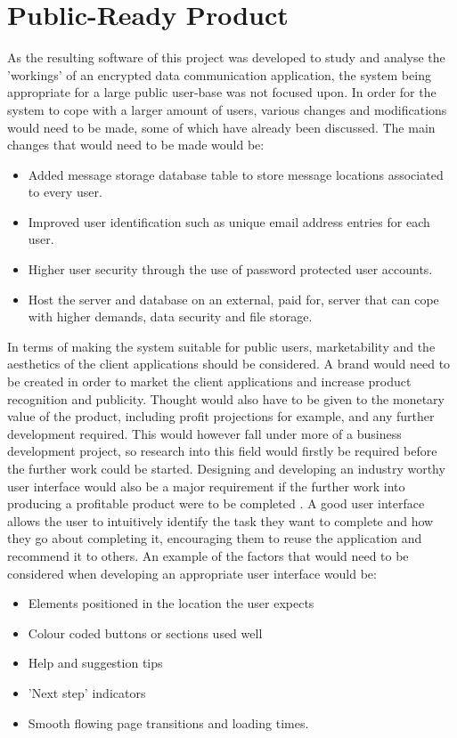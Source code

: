 \documentclass[a4paper,10pt]{report}
\begin{document}
\section{Public-Ready Product}

As the resulting software of this project was developed to study and analyse the 'workings' of an encrypted data communication application, the system being appropriate for a large public user-base was not focused upon. In order for the system to cope with a larger amount of users, various changes and modifications would need to be made, some of which have already been discussed. The main changes that would need to be made would be:

\begin{itemize}
\item Added message storage database table to store message locations associated to every user.
\item Improved user identification such as unique email address entries for each user. 
\item Higher user security through the use of password protected user accounts. 
\item Host the server and database on an external, paid for, server that can cope with higher demands, data security and file storage.
\end{itemize}

In terms of making the system suitable for public users, marketability and the aesthetics of the client applications should be considered. A brand would need to be created in order to market the client applications and increase product recognition and publicity. Thought would also have to be given to the monetary value of the product, including profit projections for example, and any further development required. This would however fall under more of a business development project, so research into this field would firstly be required before the further work could be started. Designing and developing an industry worthy user interface would also be a major requirement if the further work into producing a profitable product were to be completed \cite{interfacebook}. A good user interface allows the user to intuitively identify the task they want to complete and how they go about completing it, encouraging them to reuse the application and recommend it to others. An example of the factors that would need to be considered when developing an appropriate user interface would be:

\begin{itemize}
 \item Elements positioned in the location the user expects 
 \item Colour coded buttons or sections used well
 \item Help and suggestion tips
 \item 'Next step' indicators
 \item Smooth flowing page transitions and loading times.
\end{itemize}
\end{document}
